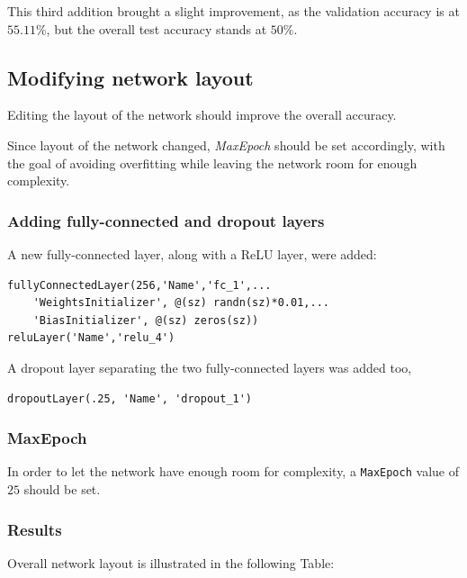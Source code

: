 \documentclass[a4paper, 11pt]{article} %
\begin{document}
This third addition brought a slight improvement, as the validation accuracy is at $55.11\%$, but the overall test accuracy stands at $50\%$.

\subsection{Modifying network layout}

Editing the layout of the network should improve the overall accuracy.

Since layout of the network changed, \emph{MaxEpoch} should be set accordingly, with the goal of avoiding overfitting while leaving the network room for enough complexity.

\subsubsection{Adding fully-connected and dropout layers}

A new fully-connected layer, along with a ReLU layer, were added:

\begin{lstlisting}
fullyConnectedLayer(256,'Name','fc_1',...
    'WeightsInitializer', @(sz) randn(sz)*0.01,...
    'BiasInitializer', @(sz) zeros(sz))
reluLayer('Name','relu_4')
\end{lstlisting}

A dropout layer separating the two fully-connected layers was added too,

\begin{lstlisting}
dropoutLayer(.25, 'Name', 'dropout_1')
\end{lstlisting}

\subsubsection{MaxEpoch}

In order to let the network have enough room for complexity, a \texttt{MaxEpoch} value of $25$ should be set.

\subsubsection{Results}\label{sec:results}

Overall network layout is illustrated in the following Table:
\end{document}
